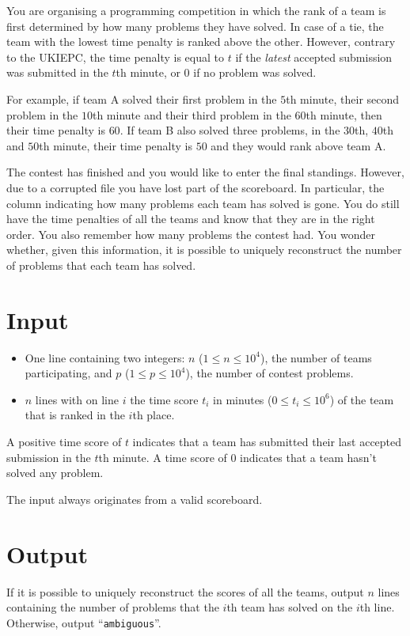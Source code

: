
You are organising a programming competition in which the rank of a team is first determined by how many problems they have solved. In case of a tie, the team with the lowest time penalty is ranked above the other. However, contrary to the UKIEPC, the time penalty is equal to $t$ if the \textit{latest} accepted submission was submitted in the $t$th minute, or $0$ if no problem was solved.

For example, if team A solved their first problem in the $5$th minute, their second problem in the $10$th minute and their third problem in the $60$th minute, then their time penalty is $60$. If team B also solved three problems, in the $30$th, $40$th and $50$th minute, their time penalty is $50$ and they would rank above team A.

The contest has finished and you would like to enter the final standings. However, due to a corrupted file you have lost part of the scoreboard. In particular, the column indicating how many problems each team has solved is gone. You do still have the time penalties of all the teams and know that they are in the right order. You also remember how many problems the contest had. You wonder whether, given this information, it is possible to uniquely reconstruct the number of problems that each team has solved.

\section*{Input}
	\begin{itemize}
		\item One line containing two integers: $n$ ($1 \le n \le 10^4$), the number of teams participating, and $p$ ($1 \le p \le 10^4$), the number of contest problems.
		\item $n$ lines with on line $i$ the time score $t_i$ in minutes ($0 \le t_i \le 10^6$) of the team that is ranked in the $i$th place.
	\end{itemize}
	A positive time score of $t$ indicates that a team has submitted their last accepted submission in the $t$th minute. A time score of $0$ indicates that a team hasn't solved any problem.

	The input always originates from a valid scoreboard.

\section*{Output}
	If it is possible to uniquely reconstruct the scores of all the teams,
	output $n$ lines containing the number of problems that the $i$th team has solved on the $i$th line.
	Otherwise, output ``\texttt{ambiguous}''.

